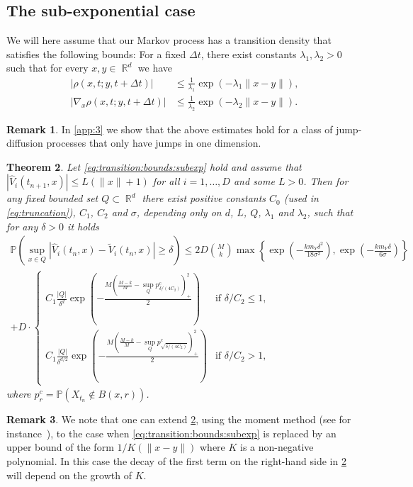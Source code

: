 \documentclass[11pt,reqno,a4paper]{amsart}
\newtheorem{theorem}{Theorem}[section]
\theoremstyle{definition}
\newtheorem{remark}[theorem]{Remark}
\numberwithin{equation}{section}
\renewcommand{\P}{\mathbb{P}}
\DeclareMathOperator{\R}{\mathbb{R}}
\DeclareMathOperator{\1}{\mathbbm{1}}
\begin{document}
\subsection{The sub-exponential case}
We will here assume that our Markov process has a transition density that satisfies the following bounds: For a fixed $\Delta t$, there exist constants $\lambda_1,\lambda_2>0$ such that for every $x,y \in \R^d$ we have
\begin{equation} \label{eq:transition:bounds:subexp}
  \begin{split}
    |\rho(x,t;y,t+\Delta t)|          & \leq \frac{1}{\lambda_1} \exp(-\lambda_1 \|x-y\|),
    \\
    |\nabla_x \rho(x,t;y,t+\Delta t)| & \leq \frac{1}{\lambda_2} \exp(-\lambda_2 \|x-y\|).
  \end{split}
\end{equation}
\begin{remark}
  In \cref{app:3} we show that the above estimates hold for a class of jump-diffusion processes that only have jumps in one dimension.
\end{remark}

\begin{theorem} \label{thm:3}
  Let \cref{eq:transition:bounds:subexp} hold and assume that $|\widehat{V}_i(t_{n+1},x)| \leq L (\|x\|+1)$ for all $i = 1,\dots,D$ and some $L > 0$.
  Then for any fixed bounded set $Q \subset \R^d$ there exist positive constants
  $C_0$ (used in \cref{eq:truncation}), $C_1$, $C_2$ and $\sigma$, depending only on $d$, $L$, $Q$, $\lambda_1$ and $\lambda_2$, such that for any $\delta > 0$ it holds
  \begin{multline*}
    \P(\sup_{x \in Q} |\widehat{V}_i(t_n,x) - \widetilde{V}_i(t_n,x)| \geq \delta) \leq
    2D{\binom{M}{k}} \max \left \{ \exp \left (-\frac{k m_Y \delta^2}{18 \sigma^2} \right ), \exp \left (-\frac{k m_Y \delta}{6 \sigma} \right )\right \}
    \\
    + D \cdot
    \begin{cases}
      C_1 \frac{|Q|}{\delta^d} \exp \left (-\frac{M \left (\frac{M-k}{M} - \sup_Q p_{\delta/(4 C_2)}^c \right )_+^2}{2} \right )            & \text{if } \delta/C_2 \leq 1,
      \\
      C_1 \frac{|Q|}{\delta^{d/2}} \exp \left (-\frac{M \left (\frac{M-k}{M} - \sup_Q p_{\sqrt{\delta/(4 C_2)}}^c \right )_+^2}{2} \right ) & \text{if } \delta/C_2 > 1,
    \end{cases}
  \end{multline*}
  where $p_{r}^c = \P(X_{t_n} \not \in B(x,r))$.
\end{theorem}
\begin{remark}\label{remark:moment}
  We note that one can extend \cref{thm:3}, using the moment method (see for instance~\cite{boucheron2013concentration}), to the case when \cref{eq:transition:bounds:subexp} is replaced by an upper bound of the form $1/K(\|x-y\|)$ where $K$ is a non-negative polynomial. In this case the decay of the first term on the right-hand side in \cref{thm:3} will depend on the growth of $K$.
\end{remark}
\end{document}

